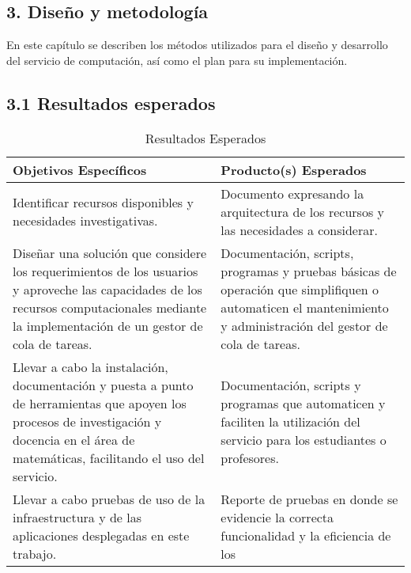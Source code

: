 \begin{spacing}{1.5}
  \begin{tightcenter}
    \section{3. Diseño y metodología}
    \mylinespacing
  \end{tightcenter}

    En este capítulo se describen los métodos utilizados para el diseño y
    desarrollo del servicio de computación, así como el plan para su
    implementación.

    \subsection{3.1 Resultados esperados}

    \begin{table}[h]
      \centering
      \begin{tabular}{p{7cm}|p{7cm}}
        \hline
        \textbf{Objetivos Específicos} & \textbf{Producto(s) Esperados}\\
        \hline
        Identificar recursos disponibles y necesidades investigativas.& Documento expresando la arquitectura de los recursos y las necesidades a considerar. \\
        \hline
        Diseñar una solución que considere los requerimientos de los usuarios y aproveche las capacidades de los recursos computacionales mediante la implementación de un gestor de cola de tareas. & Documentación, scripts, programas y pruebas básicas de operación que simplifiquen o automaticen el mantenimiento y administración del gestor de cola de tareas. \\
        \hline
        Llevar a cabo la instalación, documentación y puesta a punto de herramientas que apoyen los procesos de investigación y docencia en el área de matemáticas, facilitando el uso del servicio. & Documentación, scripts y programas que automaticen y faciliten la utilización del servicio para los estudiantes o profesores.\\
        \hline
        Llevar a cabo pruebas de uso de la infraestructura y de las aplicaciones desplegadas en este trabajo. & Reporte de pruebas en donde se evidencie la correcta funcionalidad y la eficiencia de los \\
        \hline
      \end{tabular}
      \caption{Resultados Esperados}
      \label{table:table2}
    \end{table}


\end{spacing}
